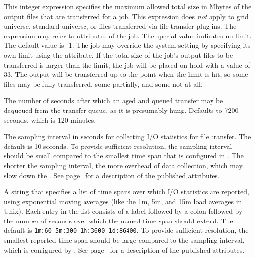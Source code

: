 \begin{description}
\label{param:MaxTransferOutputMB}
\item[\Macro{MAX\_TRANSFER\_OUTPUT\_MB}]
  This integer expression specifies the maximum allowed total size in
  Mbytes of the output files that are transferred for a job.  This
  expression does \emph{not} apply to grid universe, standard universe, or
  files transferred via file transfer plug-ins.  
  The expression may refer to attributes of the job.
  The special value  indicates no limit.  
  The default value is -1.
  The job may override the system setting
  by specifying its own limit using the 
  attribute.  If the total size of the job's output files to be
  transferred is larger than the limit, the job will be placed on hold
  with a  value of 33.
  The output will be transferred up to the point
  when the limit is hit, so some files may be fully transferred, some
  partially, and some not at all.

\label{param:MaxTransferQueueAge}
\item[\Macro{MAX\_TRANSFER\_QUEUE\_AGE}]
  The number of seconds after which an aged and queued transfer may be
  dequeued from the transfer queue, as it is presumably hung.
  Defaults to 7200 seconds, which is 120 minutes.

\label{param:TransferIoReportInterval}
\item[\Macro{TRANSFER\_IO\_REPORT\_INTERVAL}]
  The sampling interval in seconds for collecting I/O statistics for
  file transfer.  The default is 10 seconds.  To provide sufficient
  resolution, the sampling interval should be small compared to the
  smallest time span that is configured in
  .  The shorter the sampling
  interval, the more overhead of data collection, which may slow down
  the .  See
  page~\pageref{sec:FT-Scheduler-ClassAd-Attributes} for a description
  of the published attributes.

\label{param:TransferIoReportTimespans}
\item[\Macro{TRANSFER\_IO\_REPORT\_TIMESPANS}]
  A string that specifies a list of time spans over which I/O
  statistics are reported, using exponential moving averages (like the
  1m, 5m, and 15m load averages in Unix).  Each entry in the list
  consists of a label followed by a colon followed by the number of
  seconds over which the named time span should extend.  The default is
  \verb|1m:60 5m:300 1h:3600 1d:86400|.  To provide sufficient
  resolution, the smallest reported time span should be large compared
  to the sampling interval, which is configured by
  .  See
  page~\pageref{sec:FT-Scheduler-ClassAd-Attributes} for a description
  of the published attributes.


\end{description}
